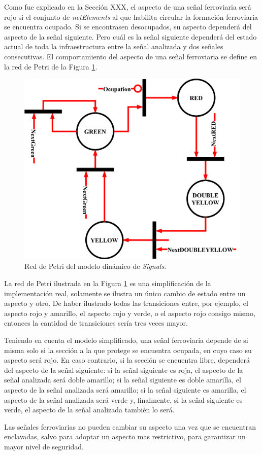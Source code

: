 	Como fue explicado en la Sección XXX, el aspecto de una señal ferroviaria será rojo si el conjunto de \textit{netElements} al que habilita circular la formación ferroviaria se encuentra ocupado. Si se encontrasen desocupados, su aspecto dependerá del aspecto de la señal siguiente. Pero cuál es la señal siguiente dependerá del estado actual de toda la infraestructura entre la señal analizada y dos señales consecutivas. El comportamiento del aspecto de una señal ferroviaria se define en la red de Petri de la Figura \ref{fig:SIG_Petri}.
	
	\begin{figure}[H]
		\centering
		\includegraphics[width=1\textwidth]{Figuras/SIG_petri}
		\centering\caption{Red de Petri del modelo dinámico de \textit{Signals}.}
		\label{fig:SIG_Petri}
	\end{figure}
	
	La red de Petri ilustrada en la Figura \ref{fig:SIG_Petri} es una simplificación de la implementación real, solamente se ilustra un único cambio de estado entre un aspecto y otro. De haber ilustrado todas las transiciones entre, por ejemplo, el aspecto rojo y amarillo, el aspecto rojo y verde, o el aspecto rojo consigo mismo, entonces la cantidad de transiciones sería tres veces mayor.
	
	Teniendo en cuenta el modelo simplificado, una señal ferroviaria depende de si misma solo si la sección a la que protege se encuentra ocupada, en cuyo caso su aspecto será rojo. En caso contrario, si la sección se encuentra libre, dependerá del aspecto de la señal siguiente: si la señal siguiente es roja, el aspecto de la señal analizada será doble amarillo; si la señal siguiente es doble amarilla, el aspecto de la señal analizada será amarillo; si la señal siguiente es amarilla, el aspecto de la señal analizada será verde y, finalmente, si la señal siguiente es verde, el aspecto de la señal analizada también lo será.
	
	Las señales ferroviarias no pueden cambiar su aspecto una vez que se encuentran enclavadas, salvo para adoptar un aspecto mas restrictivo, para garantizar un mayor nivel de seguridad.